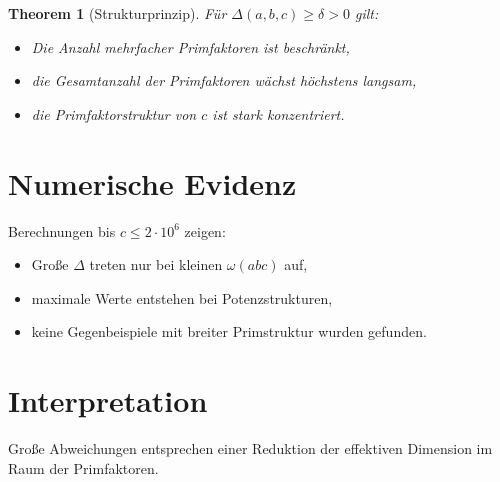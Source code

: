 \documentclass{article}
\newtheorem{theorem}{Theorem}
\begin{document}
	\begin{theorem}[Strukturprinzip]
		Für $\Delta(a,b,c) \ge \delta > 0$ gilt:
		
		\begin{itemize}
			\item Die Anzahl mehrfacher Primfaktoren ist beschränkt,
			\item die Gesamtanzahl der Primfaktoren wächst höchstens langsam,
			\item die Primfaktorstruktur von $c$ ist stark konzentriert.
		\end{itemize}
	\end{theorem}
	
	\section{Numerische Evidenz}
	
	Berechnungen bis $c \le 2\cdot 10^6$ zeigen:
	
	\begin{itemize}
		\item Große $\Delta$ treten nur bei kleinen $\omega(abc)$ auf,
		\item maximale Werte entstehen bei Potenzstrukturen,
		\item keine Gegenbeispiele mit breiter Primstruktur wurden gefunden.
	\end{itemize}
	
	\section{Interpretation}
	
	Große Abweichungen entsprechen einer Reduktion der effektiven Dimension
	im Raum der Primfaktoren.
	
\end{document}
